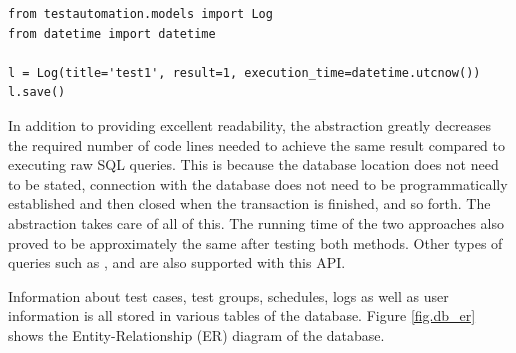 \vspace{4mm}
\begin{lstlisting}[caption=Database Communication Using Abstraction API, label={listing.db}]
from testautomation.models import Log
from datetime import datetime
 
l = Log(title='test1', result=1, execution_time=datetime.utcnow())
l.save()
\end{lstlisting}

\noindent In addition to providing excellent readability, the abstraction greatly decreases the required number of code lines needed to achieve the same result compared to executing raw SQL queries. This is because the database location does not need to be stated, connection with the database does not need to be programmatically established and then closed when the transaction is finished, and so forth. The abstraction takes care of all of this. The running time of the two approaches also proved to be approximately the same after testing both methods. Other types of queries such as ,  and  are also supported with this API.

Information about test cases, test groups, schedules, logs as well as user information is all stored in various tables of the database. Figure \ref{fig.db_er} shows the Entity-Relationship (ER) diagram of the database.


